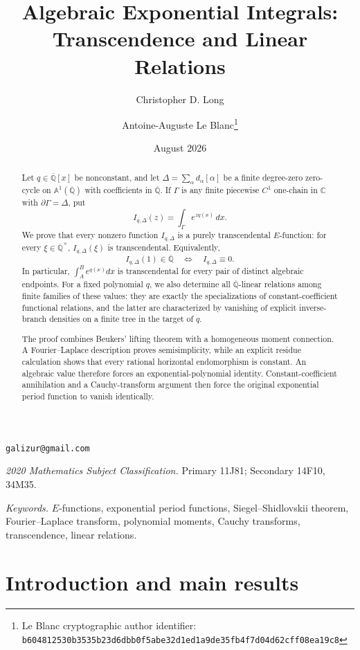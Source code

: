 \documentclass[11pt]{article}
\title{Algebraic Exponential Integrals:\\
Transcendence and Linear Relations}
\author{Christopher D. Long \and Antoine-Auguste Le Blanc\thanks{Le Blanc cryptographic author identifier: \texttt{b6048125\allowbreak{}30b3535b\allowbreak{}23d6dbb0\allowbreak{}f5abe32d\allowbreak{}1ed1a9de\allowbreak{}35fb4f7d\allowbreak{}04d62cff\allowbreak{}08ea19c8}}}
\date{August 2026}
\numberwithin{equation}{section}
\theoremstyle{definition}
\theoremstyle{remark}
\newcommand{\C}{\mathbb C}
\newcommand{\Qbar}{\overline{\mathbb Q}}
\newcommand{\Aone}{\mathbb A^1}
\begin{document}
\maketitle

\begin{center}
\small
\texttt{galizur@gmail.com}
\end{center}

\begin{abstract}
Let $q\in\Qbar[x]$ be nonconstant, and let
$\Delta=\sum_\alpha d_\alpha[\alpha]$ be a finite degree-zero zero-cycle on
$\Aone(\Qbar)$ with coefficients in $\Qbar$.  If $\Gamma$ is any finite
piecewise $C^1$ one-chain in $\C$ with $\partial\Gamma=\Delta$, put
\[
  I_{q,\Delta}(z)=\int_\Gamma e^{zq(x)}\,dx.
\]
We prove that every nonzero function $I_{q,\Delta}$ is a purely
transcendental $E$-function: for every $\xi\in\Qbar^\times$,
$I_{q,\Delta}(\xi)$ is transcendental.  Equivalently,
\[
  I_{q,\Delta}(1)\in\Qbar
  \quad\Longleftrightarrow\quad
  I_{q,\Delta}\equiv0.
\]
In particular, $\int_A^B e^{q(x)}dx$ is transcendental for every pair of
distinct algebraic endpoints.  For a fixed polynomial $q$, we also determine all $\Qbar$-linear
relations among finite families of these values: they are exactly the
specializations of constant-coefficient functional relations, and the latter
are characterized by vanishing of explicit inverse-branch densities on a
finite tree in the target of $q$.

The proof combines Beukers' lifting theorem with a homogeneous moment
connection.  A Fourier--Laplace description proves semisimplicity, while an
explicit residue calculation shows that every rational horizontal
endomorphism is constant.  An algebraic value therefore forces an
exponential-polynomial identity.  Constant-coefficient annihilation and a
Cauchy-transform argument then force the original exponential period
function to vanish identically.
\end{abstract}

\medskip
\noindent\textit{2020 Mathematics Subject Classification.}
Primary 11J81; Secondary 14F10, 34M35.

\noindent\textit{Keywords.}
$E$-functions, exponential period functions, Siegel--Shidlovskii theorem,
Fourier--Laplace transform, polynomial moments, Cauchy transforms,
transcendence, linear relations.

\section{Introduction and main results}
\end{document}
